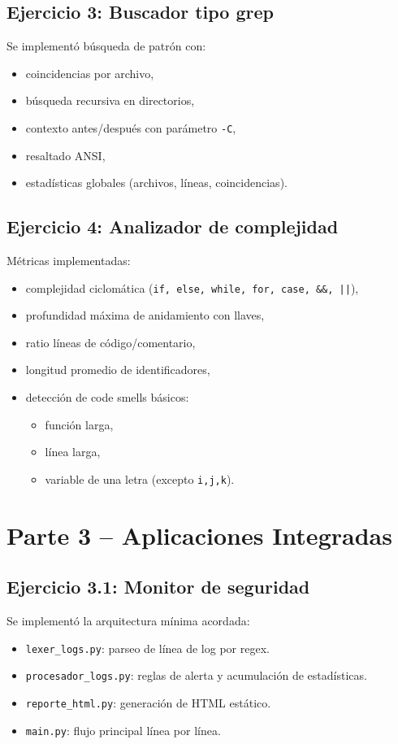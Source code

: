 \documentclass[12pt]{article}
\begin{document}
\subsection{Ejercicio 3: Buscador tipo grep}
Se implementó búsqueda de patrón con:
\begin{itemize}[leftmargin=*]
    \item coincidencias por archivo,
    \item búsqueda recursiva en directorios,
    \item contexto antes/después con parámetro \texttt{-C},
    \item resaltado ANSI,
    \item estadísticas globales (archivos, líneas, coincidencias).
\end{itemize}

\subsection{Ejercicio 4: Analizador de complejidad}
Métricas implementadas:
\begin{itemize}[leftmargin=*]
    \item complejidad ciclomática (\texttt{if, else, while, for, case, \&\&, ||}),
    \item profundidad máxima de anidamiento con llaves,
    \item ratio líneas de código/comentario,
    \item longitud promedio de identificadores,
    \item detección de code smells básicos:
    \begin{itemize}
        \item función larga,
        \item línea larga,
        \item variable de una letra (excepto \texttt{i,j,k}).
    \end{itemize}
\end{itemize}

\section{Parte 3 -- Aplicaciones Integradas}

\subsection{Ejercicio 3.1: Monitor de seguridad}
Se implementó la arquitectura mínima acordada:
\begin{itemize}[leftmargin=*]
    \item \texttt{lexer\_logs.py}: parseo de línea de log por regex.
    \item \texttt{procesador\_logs.py}: reglas de alerta y acumulación de estadísticas.
    \item \texttt{reporte\_html.py}: generación de HTML estático.
    \item \texttt{main.py}: flujo principal línea por línea.
\end{itemize}
\end{document}
